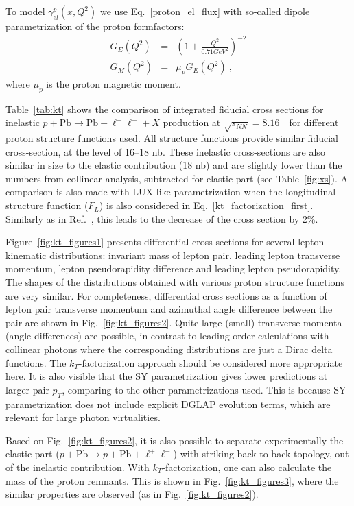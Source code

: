 To model $\gamma^{p}_{el}(x, Q^2)$ we use Eq.~\ref{proton_el_flux} with so-called dipole parametrization of the proton formfactors:
\begin{eqnarray}
G_E(Q^2) &=& \left( 1+\frac{Q^2}{0.71 GeV^2} \right)^{-2} \\
G_M(Q^2) &=& \mu_p G_E(Q^2)~,
\end{eqnarray}
where $\mu_p$ is the proton magnetic moment.

Table~\ref{tab:kt} shows the comparison of integrated fiducial cross sections for inelastic $p+\textrm{Pb}\rightarrow \textrm{Pb} + \ell^+\ell^- + X$ production at $\sqrt{s_{N N}} = 8.16$~\TeV\ for different proton structure functions used.
All structure functions provide similar fiducial cross-section, at the level of 16--18 nb.
These inelastic cross-sections are also similar in size to the elastic contribution (18 nb) and are slightly lower than the numbers from collinear analysis, subtracted for elastic part (see Table~\ref{fig:xs}).
A comparison is also made with LUX-like parametrization when the longitudinal structure function ($F_L$) is also considered in Eq.~\ref{kt_factorization_first}. Similarly as in Ref.~\cite{Luszczak:2018ntp}, this leads to the decrease of the cross section by 2\%.

Figure~\ref{fig:kt_figures1} presents differential cross sections for several lepton kinematic distributions: invariant mass of lepton pair, leading lepton transverse momentum, lepton pseudorapidity difference and leading lepton pseudorapidity.
The shapes of the distributions obtained with various proton structure functions are very similar.
For completeness, differential cross sections as a function of lepton pair transverse momentum and azimuthal angle difference between the pair  are shown in Fig.~\ref{fig:kt_figures2}. Quite large (small) transverse momenta (angle differences) are possible, in contrast to leading-order calculations with collinear photons where the corresponding distributions are just a Dirac delta functions. 
The $k_T$-factorization approach should be considered more appropriate here. It is also visible that the SY parametrization gives lower predictions at larger pair-$p_T$, comparing to the other parametrizations used. This is because SY parametrization does not include explicit DGLAP evolution terms, which are relevant for large photon virtualities.

Based on Fig.~\ref{fig:kt_figures2}, it is also possible to separate experimentally the elastic part ($p+\textrm{Pb}\rightarrow p+ \textrm{Pb} + \ell^+\ell^-$) with striking back-to-back topology, out of the inelastic contribution.
With $k_T$-factorization, one can also calculate the mass of the proton remnants. This is shown in Fig.~\ref{fig:kt_figures3}, where the similar properties are observed (as in Fig.~\ref{fig:kt_figures2}).



